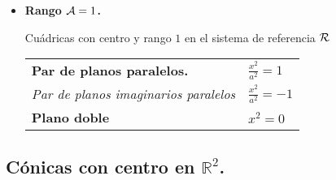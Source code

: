 \documentclass[11pt, a4paper]{article}
\newif\IfInSansMode
\theoremstyle{theorem-style}
\theoremstyle{definition-style}
\theoremstyle{remark-style}
\theoremstyle{example-style}
\begin{document}
\begin{itemize}
Consideramos cu\'adricas con centro y rango $2$ en el sistema de referencia $\cal R$

\vspace{.5cm}

\begin{tabular}{ll}
{\bf Cilindro el\'iptico} \hspace{5cm} & 
$
\frac{{x}^2}{a^2} + \frac{{y}^2}{b^2}=1
$
\vspace{.5cm}
\\
{\it Cilindro imaginario}  &
$
-\frac{{x}^2}{a^2} - \frac{{y}^2}{b^2}=1
$
\vspace{.5cm}
\\
{\bf  Cilindro hiperb\'olico}  &
$
\frac{{x}^2}{a^2} - \frac{{y}^2}{b^2}=1
$
\vspace{.5cm}
\\
{\bf  Par de planos reales}  &
$
\frac{{x}^2}{a^2} - \frac{{y}^2}{b^2}=0
$
\vspace{.5cm}
\\
{\it Par de planos imaginarios} &
$
\frac{{x}^2}{a^2} + \frac{{y}^2}{b^2}=0
$
\vspace{.3cm}
\\
\end{tabular}
 


\item {\bf Rango ${\cal A}=1$.} 

\vspace{.4cm}

Cu\'adricas con centro y rango $1$ en el sistema de referencia $\cal R$

\vspace{.5cm}

\begin{tabular}{ll}
{\bf  Par de planos paralelos.} \hspace{5cm} & 
$
\frac{{x}^2}{a^2}=1
$
\vspace{.4cm}
\\
{\it Par de planos imaginarios paralelos}  &
$
\frac{{x}^2}{a^2} =-1
$
\vspace{.4cm}
\\
{\bf  Plano doble}  &
$
{{x}^2} = 0
$
\vspace{.3cm}
\\
\end{tabular}

\end{itemize}


\subsection{\bf  C\'onicas con centro en $\mathbb{R}^2$.}
\end{document}
